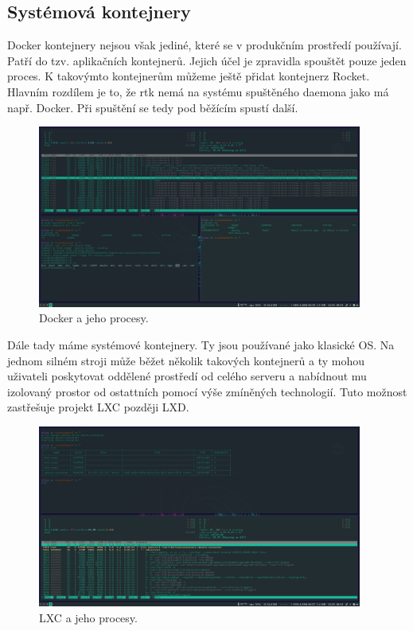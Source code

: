 
\subsection{Systémová kontejnery}

Docker kontejnery nejsou však jediné, které se v produkčním prostředí používají. Patří do tzv. aplikačních kontejnerů. Jejich účel je zpravidla spouštět pouze jeden proces. K takovýmto kontejnerům můžeme ještě přidat kontejnerz Rocket. Hlavním rozdílem je to, že rtk nemá na systému spuštěného daemona jako má např. Docker. Při spuštění se tedy pod běžícím spustí další. 

\begin{figure}[!ht]
	\centering
	\includegraphics[width=0.95\textwidth, angle=0]{docker-screen.png}
	\caption[Docker kontejnery]{Docker a jeho procesy.}
	\label{fig:docker-list}
\end{figure}

Dále tady máme systémové kontejnery. Ty jsou používané jako klasické OS. Na jednom silném stroji může běžet několik takových kontejnerů a ty mohou uživateli poskytovat oddělené prostředí od celého serveru a nabídnout mu izolovaný prostor od ostattních pomocí výše zmíněných technologií. Tuto možnost zastřešuje projekt LXC později LXD.


\begin{figure}[!ht]
	\centering
	\includegraphics[width=0.95\textwidth, angle=0]{lxc-screen.png}
	\caption[LXC systémové kontejnery]{LXC a jeho procesy.}
	\label{fig:lxc-list}
\end{figure}